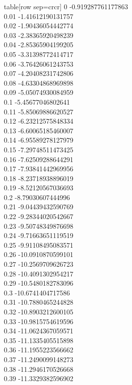   table[row sep=crcr]{%
0	-0.919287761177863\\
0.01	-1.41612190131757\\
0.02	-1.90436054442774\\
0.03	-2.38365920498239\\
0.04	-2.85365904199205\\
0.05	-3.31398772414717\\
0.06	-3.76426061243753\\
0.07	-4.20408231742806\\
0.08	-4.63304868969898\\
0.09	-5.05074930084959\\
0.1	-5.45677046802641\\
0.11	-5.85069886620527\\
0.12	-6.23212575848334\\
0.13	-6.60065185460007\\
0.14	-6.95589278127979\\
0.15	-7.29748511473425\\
0.16	-7.62509288644291\\
0.17	-7.93841442969956\\
0.18	-8.23718938896019\\
0.19	-8.52120567036693\\
0.2	-8.79030607444996\\
0.21	-9.04439432590769\\
0.22	-9.28344020542667\\
0.23	-9.50748349876698\\
0.24	-9.71663651119519\\
0.25	-9.91108495083571\\
0.26	-10.0910870599101\\
0.27	-10.2569709626723\\
0.28	-10.4091302954217\\
0.29	-10.5480182783096\\
0.3	-10.6741404717586\\
0.31	-10.7880465244828\\
0.32	-10.8903212600105\\
0.33	-10.9815754619596\\
0.34	-11.0624367059571\\
0.35	-11.1335405515898\\
0.36	-11.1955223566662\\
0.37	-11.2490099148273\\
0.38	-11.2946170526668\\
0.39	-11.3329382596902\\
}

